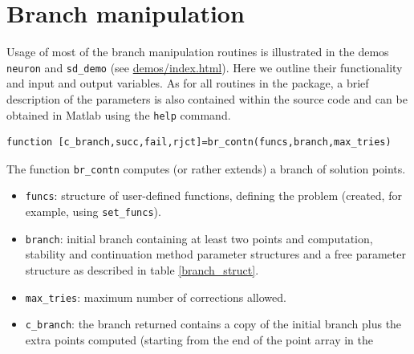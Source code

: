 \documentclass[10pt]{scrartcl}
\newcommand{\demobase}{\url{demos/index.html}}
\newcommand{\blist}[1]{\mbox{\lstinline!#1!}}
\begin{document}
{\section{Branch manipulation}\label{branch_manipulation}

Usage of most of the branch manipulation routines is illustrated in
the demos \texttt{neuron} and \texttt{sd\_demo} (see
\demobase{}).  Here we outline their functionality and
input and output variables.  As for all routines in the package, a
brief description of the parameters is also contained within the
source code and can be obtained in Matlab using the \blist{help}
command.
\begin{lstlisting}
function [c_branch,succ,fail,rjct]=br_contn(funcs,branch,max_tries)  
\end{lstlisting}
\noindent The function \blist{br_contn} computes (or rather 
extends) a branch of solution
points. 
\begin{itemize}
\item \blist{funcs}: structure of user-defined functions, defining the
  problem (created, for example, using \blist{set_funcs}).
\item \blist{branch}: initial branch 
containing at least two points and computation, stability and 
continuation method parameter
structures and a free parameter structure as described in 
table \ref{branch_struct}. 
\item \blist{max_tries}:
maximum number of corrections allowed.
\item \blist{c_branch}:
the branch returned contains a copy of the initial branch plus
the extra points computed (starting from the end of the point array in the

\end{itemize}}
\end{document}
